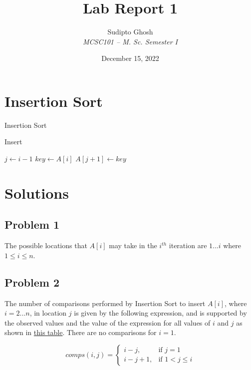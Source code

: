 \documentclass{article}
\title{Lab Report 1}
\author{Sudipto Ghosh\\\it{MCSC101 -- M. Sc. Semester I}}
\affil{Department of Computer Science\\University of Delhi}
\date{\printdayoff December 15, 2022}
\begin{document}
\maketitle

\section{Insertion Sort}
\begin{algorithm}
\caption{Insertion Sort}
\label{alg:one}
\end{algorithm}
\begin{algorithm}
\caption{Insert}
\label{alg:two}
$j \gets i - 1$\;
$key \gets A[i]$\;
$A[j + 1] \gets key$\;
\end{algorithm}
\section{Solutions}
\subsection{Problem 1}
The possible locations that $A[i]$ may take in the $i^{th}$ iteration are $1...i$ where $1 \leq i \leq n$.

\subsection{Problem 2}
The number of comparisons performed by Insertion Sort to insert $A[i]$, where $i=2...n$, in location $j$ is given by the following expression, and is supported by the observed values and the value of the expression for all values of $i$ and $j$ as shown in \hyperref[sec:data]{this table}. There are no comparisons for $i=1$.

\begin{equation*}
comps(i,j) = 
\left\{
    \begin{array}{ll}
        i - j, & \text{if } j = 1\\
        i - j + 1, & \text{if } 1 < j \leq i
    \end{array}
\right.
\end{equation*}
\end{document}
